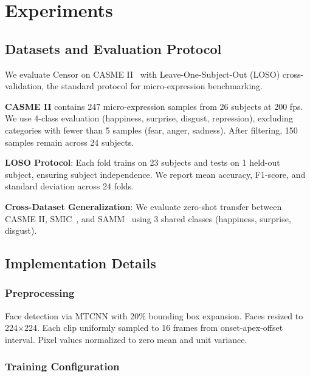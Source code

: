 
\section{Experiments}
\label{sec:experiments}

\subsection{Datasets and Evaluation Protocol}

We evaluate Censor on CASME II~\cite{yan2014casme2} with Leave-One-Subject-Out (LOSO) cross-validation, the standard protocol for micro-expression benchmarking.

\textbf{CASME II} contains 247 micro-expression samples from 26 subjects at 200 fps. We use 4-class evaluation (happiness, surprise, disgust, repression), excluding categories with fewer than 5 samples (fear, anger, sadness). After filtering, 150 samples remain across 24 subjects.

\textbf{LOSO Protocol}: Each fold trains on 23 subjects and tests on 1 held-out subject, ensuring subject independence. We report mean accuracy, F1-score, and standard deviation across 24 folds.

\textbf{Cross-Dataset Generalization}: We evaluate zero-shot transfer between CASME II, SMIC~\cite{li2013smic}, and SAMM~\cite{yap2018samm} using 3 shared classes (happiness, surprise, disgust).

\subsection{Implementation Details}

\subsubsection{Preprocessing}

Face detection via MTCNN with 20\% bounding box expansion. Faces resized to 224$\times$224. Each clip uniformly sampled to 16 frames from onset-apex-offset interval. Pixel values normalized to zero mean and unit variance.

\subsubsection{Training Configuration}

